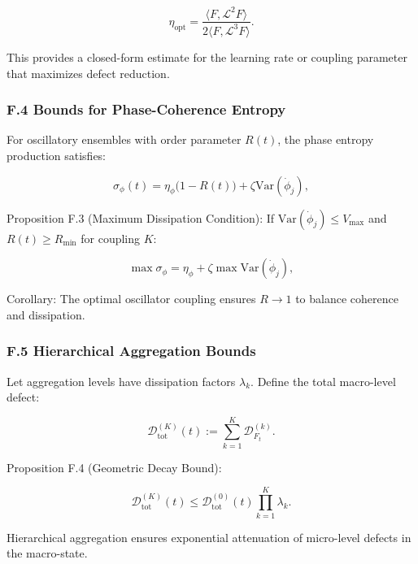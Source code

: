\documentclass[12pt]{article}
\theoremstyle{plain}
\begin{document}
\begin{equation}
\eta_\mathrm{opt} = \frac{\langle F, \mathcal{L}^2 F \rangle}{2 \langle F, \mathcal{L}^3 F \rangle}.
\end{equation}

This provides a closed-form estimate for the learning rate or coupling parameter that maximizes defect reduction.

\subsubsection*{F.4 Bounds for Phase-Coherence Entropy}

For oscillatory ensembles with order parameter \(R(t)\), the phase entropy production satisfies:

\begin{equation}
\sigma_\phi(t) = \eta_\phi \big(1 - R(t)\big) + \zeta \mathrm{Var}(\dot{\phi}_j),
\end{equation}

Proposition F.3 (Maximum Dissipation Condition):
If \(\mathrm{Var}(\dot{\phi}_j) \le V_{\max}\) and \(R(t) \ge R_{\min}\) for coupling \(K\):

\begin{equation}
\max \sigma_\phi = \eta_\phi + \zeta \max \mathrm{Var}(\dot{\phi}_j),
\end{equation}

Corollary: The optimal oscillator coupling ensures \(R \to 1\) to balance coherence and dissipation.

\subsubsection*{F.5 Hierarchical Aggregation Bounds}

Let aggregation levels have dissipation factors \(\lambda_k\). Define the total macro-level defect:

\begin{equation}
\mathcal{D}^{(K)}_\mathrm{tot}(t) := \sum_{k=1}^K \mathcal{D}^{(k)}_{F_t}.
\end{equation}

Proposition F.4 (Geometric Decay Bound):

\begin{equation}
\mathcal{D}^{(K)}_\mathrm{tot}(t) \le \mathcal{D}^{(0)}_\mathrm{tot}(t) \prod_{k=1}^K \lambda_k.
\end{equation}

Hierarchical aggregation ensures exponential attenuation of micro-level defects in the macro-state.
\end{document}
